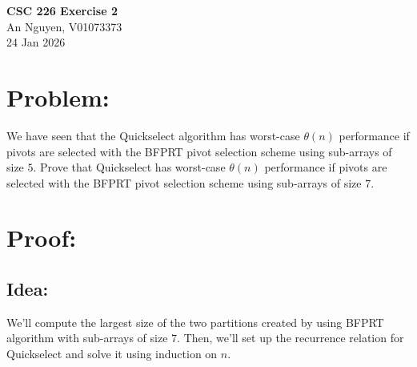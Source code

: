 \documentclass[12pt, b5paper]{article}
\begin{document}
\begin{center}
{\bf CSC 226
Exercise 2}\\
An Nguyen, V01073373\\
24 Jan 2026
\end{center}

\section*{Problem:}
We have seen that the Quickselect algorithm has worst-case $\theta(n)$ performance if pivots are 
selected with the BFPRT pivot selection scheme using sub-arrays of size $5$. Prove that Quickselect 
has worst-case $\theta(n)$ performance if pivots are selected with the BFPRT pivot selection scheme 
using sub-arrays of size $7$.
\section*{Proof:}
\subsection*{Idea: }
We'll compute the largest size of the two partitions created by using BFPRT algorithm with sub-arrays of size $7$. 
Then, we'll set up the recurrence relation for Quickselect and solve it using induction on $n$. 
\end{document}
